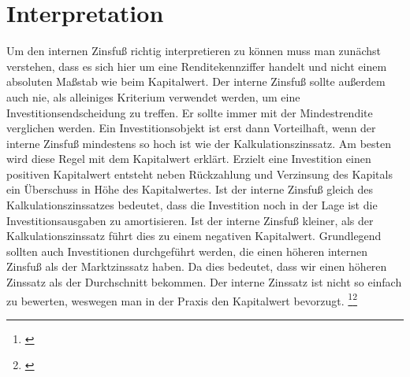 \section{Interpretation}
Um den internen Zinsfuß richtig interpretieren zu können muss man zunächst verstehen, dass es sich hier um eine Renditekennziffer handelt und nicht einem absoluten Maßstab wie beim Kapitalwert. Der interne Zinsfuß sollte außerdem auch nie, als alleiniges Kriterium verwendet werden, um eine Investitionsendscheidung zu treffen. Er sollte immer mit der Mindestrendite verglichen werden. Ein Investitionsobjekt ist erst dann Vorteilhaft, wenn der interne Zinsfuß mindestens so hoch ist wie der Kalkulationszinssatz. Am besten wird diese Regel mit dem Kapitalwert erklärt. Erzielt eine Investition einen positiven Kapitalwert entsteht neben Rückzahlung und Verzinsung des Kapitals ein Überschuss in Höhe des Kapitalwertes. Ist der interne Zinsfuß gleich des Kalkulationszinssatzes bedeutet, dass die Investition noch in der Lage ist die Investitionsausgaben zu amortisieren. Ist der interne Zinsfuß kleiner, als der Kalkulationszinssatz führt dies zu einem negativen Kapitalwert. Grundlegend sollten auch Investitionen durchgeführt werden, die einen höheren internen Zinsfuß als der Marktzinssatz haben. Da dies bedeutet, dass wir einen höheren Zinssatz als der Durchschnitt bekommen. Der interne Zinssatz ist nicht so einfach zu bewerten, weswegen man in der Praxis den Kapitalwert bevorzugt.
\footnote{\cite{lex-interner-zinsfuss}}\footnote{\cite{studyflix-interner-zinsfuss}}